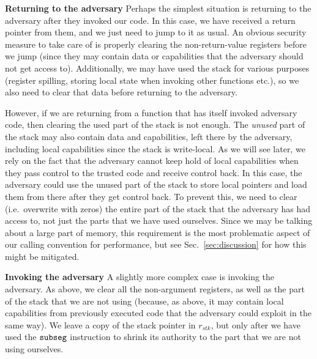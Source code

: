 \documentclass{llncs}
\newcommand{\sectionname}{Sec.}
\newcommand{\var}[1]{\mathit{#1}}
\newcommand{\stk}{\var{stk}}
\newcommand{\zinstr}[1]{\mathtt{#1}}
\newcommand{\threeinstr}[4]{
  \ifthenelse{\equal{#2#3#4}{}}
  {\zinstr{#1}}
  {\zinstr{#1} \; #2 \; #3 \; #4}
}
\newcommand{\subseg}[3]{\threeinstr{subseg}{#1}{#2}{#3}}
\begin{document}
\textbf{Returning to the adversary} Perhaps the simplest situation is returning
to the adversary after they invoked our code. In this case, we have received a
return pointer from them, and we just need to jump to it as usual. An obvious
security measure to take care of is properly clearing the non-return-value
registers before we jump (since they may contain data or capabilities that the
adversary should not get access to). Additionally, we may have used the stack
for various purposes (register spilling, storing local state when invoking other
functions etc.), so we also need to clear that data before returning to the
adversary.

However, if we are returning from a function that has itself invoked adversary
code, then clearing the used part of the stack is not enough. The \emph{unused}
part of the stack may also contain data and capabilities, left there by the
adversary, including local capabilities since the stack is write-local. As we
will see later, we rely on the fact that the adversary cannot keep hold of local
capabilities when they pass control to the trusted code and receive control
back. In this case, the adversary could use the unused part of the stack to
store local pointers and load them from there after they get control back. To
prevent this, we need to clear (i.e.\ overwrite with zeros) the entire part of
the stack that the adversary has had access to, not just the parts that we have
used ourselves. Since we may be talking about a large part of memory, this
requirement is the most problematic aspect of our calling convention for
performance, but see \sectionname~\ref{sec:discussion} for how this might be
mitigated.

\textbf{Invoking the adversary} A slightly more complex case is invoking the
adversary. As above, we clear all the non-argument registers, as well as the
part of the stack that we are not using (because, as above, it may contain local
capabilities from previously executed code that the adversary could exploit in
the same way). We leave a copy of the stack pointer in $r_\stk$, but only after
we have used the $\subseg{}{}{}$ instruction to shrink its authority to the part
that we are not using ourselves.
\end{document}
